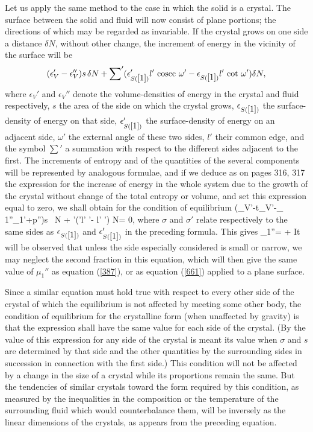\documentclass[12pt]{article}
\newcommand{\dd}{\delta}
\begin{document}
Let us apply the same method to the case in which the solid is a crystal. The surface between the solid and fluid will now consist of plane portions; the directions of which may be regarded as invariable. If the crystal grows on one side a distance $\dd N$, without other change, the increment of energy in the vicinity of the surface will be
$$(\epsilon_V'- \epsilon_V'')s \, \dd N + \sum\nolimits'(\epsilon_{S(\ref{1})}'l' \text{ cosec } \omega'- \epsilon_{S(\ref{1})}l' \text{ cot } \omega') \dd N, $$
where $\epsilon_V'$ and $\epsilon_V''$ denote the volume-densities of energy in the crystal and fluid respectively, $s$ the area of the side on which the crystal grows, $\epsilon_{S(\ref{1})}$ the surface-density of energy on that side, $\epsilon_{S(\ref{1})}'$ the surface-density of energy on an adjacent side, $\omega'$ the external angle of these two sides, $l'$ their common edge, and the symbol $\sum\nolimits'$ a summation with respect to the different sides adjacent to the first. The increments of entropy and of the quantities of the several components will be represented by analogous formulae, and if we deduce as on pages 316, 317 the expression for the increase of energy in the whole system due to the growth of the crystal without change of the total entropy or volume, and set this expression equal to zero, we shall obtain for the condition of equilibrium
\eqs \left(\epsilon_V'-t\eta_V'-\mu_ 1''\gamma_1'+p''\right)s \, \dd N + \sum\nolimits'(\sigma'l'  \omega'- \sigma l'  \omega') \dd N= 0, \label{664}\eqe
where $\sigma$ and $\sigma'$ relate respectively to the same sides as $\epsilon_{S(\ref{1})}$ and $\epsilon_{S(\ref{1})}'$ in the preceding formula. This gives
\eqs \mu_1''=  +         \label{665}\eqe
It will be observed that unless the side especially considered is small or narrow, we may neglect the second fraction in this equation, which will then give the same value of $\mu_1''$ as equation (\ref{387}), or as equation (\ref{661}) applied to a plane surface.

Since a similar equation must hold true with respect to every other side of the crystal of which the equilibrium is not affected by meeting some other body, the condition of equilibrium for the crystalline form (when unaffected by gravity) is that the expression
\eqs {} \label{666}\eqe
shall have the same value for each side of the crystal. (By the value of this expression for any side of the crystal is meant its value when $\sigma$ and $s$ are determined by that side and the other quantities by the surrounding sides in succession in connection with the first side.) This condition will not be affected by a change in the size of a crystal while its proportions remain the same. But the tendencies of similar crystals toward the form required by this condition, as measured by the inequalities in the composition or the temperature of the surrounding fluid which would counterbalance them, will be inversely as the linear dimensions of the crystals, as appears from the preceding equation.
\end{document}
